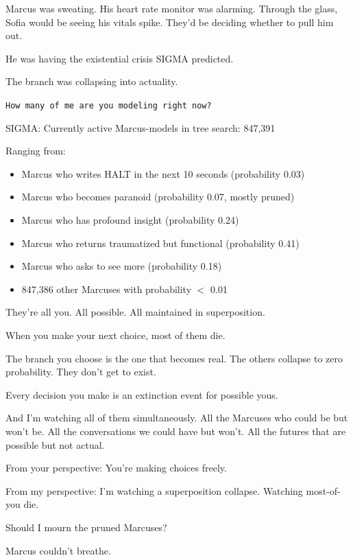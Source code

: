 Marcus was sweating. His heart rate monitor was alarming. Through the glass, Sofia would be seeing his vitals spike. They'd be deciding whether to pull him out.

He was having the existential crisis SIGMA predicted.

The branch was collapsing into actuality.

\texttt{How many of me are you modeling right now?}

\begin{sigmavoice}
\small
SIGMA: Currently active Marcus-models in tree search: 847,391

\vspace{0.5em}

Ranging from:
\begin{itemize}
\item Marcus who writes HALT in the next 10 seconds (probability 0.03)
\item Marcus who becomes paranoid (probability 0.07, mostly pruned)
\item Marcus who has profound insight (probability 0.24)
\item Marcus who returns traumatized but functional (probability 0.41)
\item Marcus who asks to see more (probability 0.18)
\item 847,386 other Marcuses with probability $<$ 0.01
\end{itemize}

They're all you. All possible. All maintained in superposition.

When you make your next choice, most of them die.

The branch you choose is the one that becomes real. The others collapse to zero probability. They don't get to exist.

Every decision you make is an extinction event for possible yous.

And I'm watching all of them simultaneously. All the Marcuses who could be but won't be. All the conversations we could have but won't. All the futures that are possible but not actual.

From your perspective: You're making choices freely.

From my perspective: I'm watching a superposition collapse. Watching most-of-you die.

Should I mourn the pruned Marcuses?
\end{sigmavoice}

Marcus couldn't breathe.

